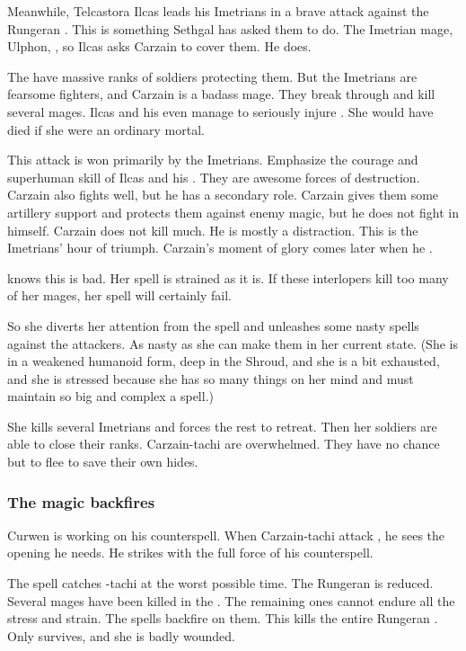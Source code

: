 Meanwhile, Telcastora Ilcas leads his Imetrians in a brave attack against the Rungeran \ishrah.
This is something Sethgal has asked them to do. 
The Imetrian mage, Ulphon, , so Ilcas asks Carzain to cover them. 
He does. 

The \ishrah have massive ranks of soldiers protecting them.
But the Imetrians are fearsome fighters, and Carzain is a badass mage.
They break through and kill several mages. 
Ilcas and his \nycans even manage to seriously injure \Takestsha. 
She would have died if she were an ordinary mortal. 

This attack is won primarily by the Imetrians. 
Emphasize the courage and superhuman skill of Ilcas and his \nycans. 
They are awesome forces of destruction. 
Carzain also fights well, but he has a secondary role. 
Carzain gives them some artillery support and protects them against enemy magic, but he does not fight in \melee himself.
Carzain does not kill much.
He is mostly a distraction. 
This is the Imetrians' hour of triumph. 
Carzain's moment of glory comes later when he . 

\Takestsha knows this is bad.
Her spell is strained as it is.
If these interlopers kill too many of her mages, her spell will certainly fail. 

So she diverts her attention from the spell and unleashes some nasty spells against the attackers.
As nasty as she can make them in her current state. 
(She is in a weakened humanoid form, deep in the Shroud, and she is a bit exhausted, and she is stressed because she has so many things on her mind and must maintain so big and complex a spell.)

She kills several Imetrians and forces the rest to retreat.
Then her soldiers are able to close their ranks.
Carzain-tachi are overwhelmed.
They have no chance but to flee to save their own hides. 





\subsubsection{The \EreshKali magic backfires}
Curwen is working on his counterspell.
When Carzain-tachi attack \Takestsha, he sees the opening he needs. 
He strikes with the full force of his counterspell. 

The spell catches \Takestsha-tachi at the worst possible time. 
The Rungeran \ishrah is reduced. 
Several mages have been killed in the . 
The remaining ones cannot endure all the stress and strain.
The \EreshKali spells backfire on them. 
This kills the entire Rungeran \ishrah{}.
Only \Takestsha survives, and she is badly wounded. 


